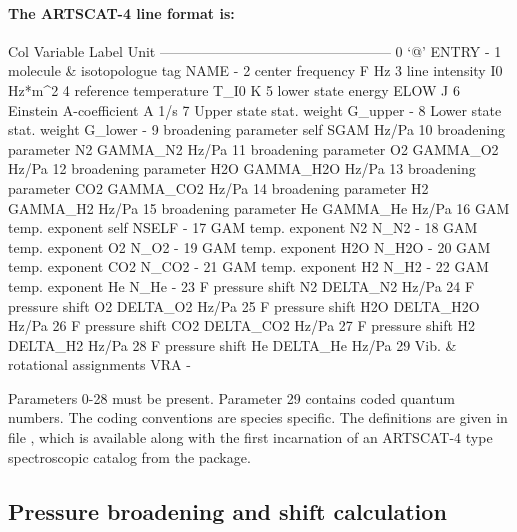 \paragraph*{The ARTSCAT-4 line format is:}
\begin{code}

Col  Variable                        Label    Unit
--------------------------------------------------
 0   `@'                             ENTRY       -
 1   molecule & isotopologue tag      NAME       -
 2   center frequency                    F      Hz
 3   line intensity                     I0  Hz*m^2
 4   reference temperature            T_I0       K
 5   lower state energy               ELOW       J
 6   Einstein A-coefficient              A     1/s 
 7   Upper state stat. weight      G_upper       -
 8   Lower state stat. weight      G_lower       -
 9   broadening parameter self        SGAM   Hz/Pa
10   broadening parameter N2      GAMMA_N2   Hz/Pa
11   broadening parameter O2      GAMMA_O2   Hz/Pa
12   broadening parameter H2O    GAMMA_H2O   Hz/Pa
13   broadening parameter CO2    GAMMA_CO2   Hz/Pa
14   broadening parameter H2      GAMMA_H2   Hz/Pa
15   broadening parameter He      GAMMA_He   Hz/Pa
16   GAM temp. exponent self         NSELF       -
17   GAM temp. exponent N2            N_N2       -
18   GAM temp. exponent O2            N_O2       -
19   GAM temp. exponent H2O          N_H2O       -
20   GAM temp. exponent CO2          N_CO2       -
21   GAM temp. exponent H2            N_H2       -
22   GAM temp. exponent He            N_He       -
23   F pressure shift N2          DELTA_N2   Hz/Pa
24   F pressure shift O2          DELTA_O2   Hz/Pa   
25   F pressure shift H2O        DELTA_H2O   Hz/Pa   
26   F pressure shift CO2        DELTA_CO2   Hz/Pa   
27   F pressure shift H2          DELTA_H2   Hz/Pa   
28   F pressure shift He          DELTA_He   Hz/Pa   
29   Vib. & rotational assignments     VRA       -                      

\end{code}
Parameters 0-28 must be present. Parameter 29 contains coded quantum numbers.
The coding conventions are species specific. The definitions are given in file
, which is available along with
the first incarnation of an ARTSCAT-4 type spectroscopic catalog from the
 package.

\subsection{Pressure broadening and shift calculation}

